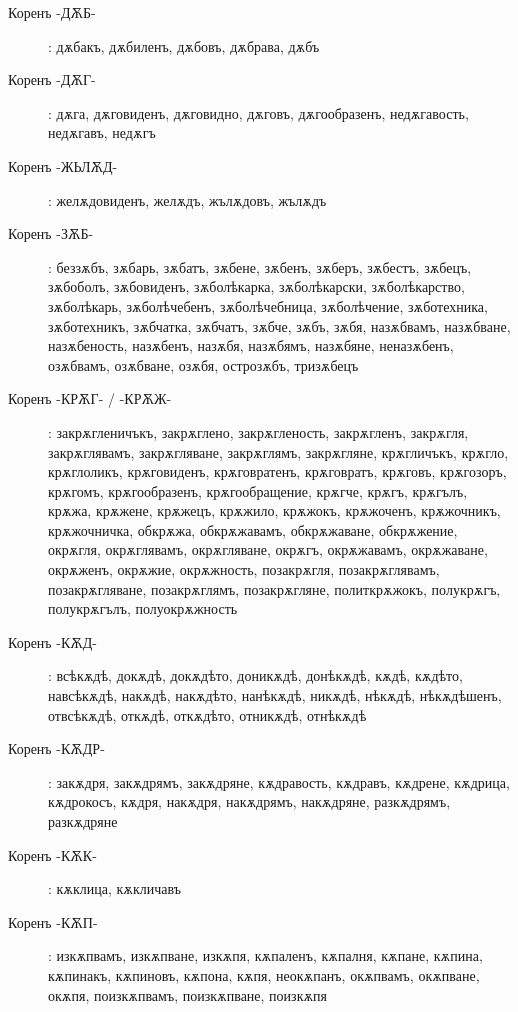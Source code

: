 \documentclass{article}
\begin{document}
\begin{description}
	\item[Коренъ -ДѪБ-]: дѫбакъ, дѫбиленъ, дѫбовъ, дѫбрава, дѫбъ
	
	\item[Коренъ -ДѪГ-]: дѫга, дѫговиденъ, дѫговидно, дѫговъ, дѫгообразенъ, недѫгавость, недѫгавъ, недѫгъ
	
	\item[Коренъ -ЖЬЛѪД-]: желѫдовиденъ, желѫдъ, жълѫдовъ, жълѫдъ
	
	\item[Коренъ -ЗѪБ-]: беззѫбъ, зѫбарь, зѫбатъ, зѫбене, зѫбенъ, зѫберъ, зѫбестъ, зѫбецъ, зѫбоболъ, зѫбовиденъ, зѫболѣкарка, зѫболѣкарски, зѫболѣкарство, зѫболѣкарь, зѫболѣчебенъ, зѫболѣчебница, зѫболѣчение, зѫботехника, зѫботехникъ, зѫбчатка, зѫбчатъ, зѫбче, зѫбъ, зѫбя, назѫбвамъ, назѫбване, назѫбеность, назѫбенъ, назѫбя, назѫбямъ, назѫбяне, неназѫбенъ, озѫбвамъ, озѫбване, озѫбя, острозѫбъ, тризѫбецъ
	
	\item[Коренъ -КРѪГ- / -КРѪЖ-]: закрѫгленичъкъ, закрѫглено, закрѫгленость, закрѫгленъ, закрѫгля, закрѫглявамъ, закрѫгляване, закрѫглямъ, закрѫгляне, крѫгличъкъ, крѫгло, крѫглоликъ, крѫговиденъ, крѫговратенъ, крѫговратъ, крѫговъ, крѫгозоръ, крѫгомъ, крѫгообразенъ, крѫгообращение, крѫгче, крѫгъ, крѫгълъ, крѫжа, крѫжене, крѫжецъ, крѫжило, крѫжокъ, крѫжоченъ, крѫжочникъ, крѫжочничка, обкрѫжа, обкрѫжавамъ, обкрѫжаване, обкрѫжение, окрѫгля, окрѫглявамъ, окрѫгляване, окрѫгъ, окрѫжавамъ, окрѫжаване, окрѫженъ, окрѫжие, окрѫжность, позакрѫгля, позакрѫглявамъ, позакрѫгляване, позакрѫглямъ, позакрѫгляне, политкрѫжокъ, полукрѫгъ, полукрѫгълъ, полуокрѫжность
	
	\item[Коренъ -КѪД-]: всѣкѫдѣ, докѫдѣ, докѫдѣто, доникѫдѣ, донѣкѫдѣ, кѫдѣ, кѫдѣто, навсѣкѫдѣ, накѫдѣ, накѫдѣто, нанѣкѫдѣ, никѫдѣ, нѣкѫдѣ, нѣкѫдѣшенъ, отвсѣкѫдѣ, откѫдѣ, откѫдѣто, отникѫдѣ, отнѣкѫдѣ
	
	\item[Коренъ -КѪДР-]: закѫдря, закѫдрямъ, закѫдряне, кѫдравость, кѫдравъ, кѫдрене, кѫдрица, кѫдрокосъ, кѫдря, накѫдря, накѫдрямъ, накѫдряне, разкѫдрямъ, разкѫдряне
	\item[Коренъ -КѪК-]: кѫклица, кѫкличавъ
	
	\item[Коренъ -КѪП-]: изкѫпвамъ, изкѫпване, изкѫпя, кѫпаленъ, кѫпалня, кѫпане, кѫпина, кѫпинакъ, кѫпиновъ, кѫпона, кѫпя, неокѫпанъ, окѫпвамъ, окѫпване, окѫпя, поизкѫпвамъ, поизкѫпване, поизкѫпя
	

\end{description}
\end{document}
